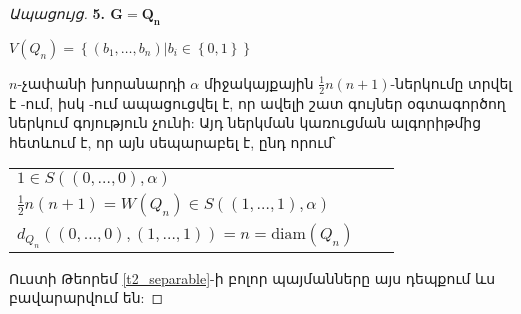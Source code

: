 \begin{proof}[Ապացույց]
\textbf{5. $\mathbf{G=Q_n}$}
\begin{center}
$V(Q_n)=\left\{(b_1,\ldots,b_n) | b_i \in \left\{0,1\right\}\right\}$
\end{center}
$n$-չափանի խորանարդի $\alpha$ միջակայքային $\frac{1}{2}n(n+1)$-ներկումը տրվել է \cite{Petrosyan2010}-ում, իսկ \cite{PetrosyanKhachatrianYepremyanTananyan2011,PetrosyanKhachatrianTananyan2013}-ում ապացուցվել է, որ ավելի շատ գույներ օգտագործող ներկում գոյություն չունի: Այդ ներկման կառուցման ալգորիթմից հետևում է, որ այն սեպարաբել է, ընդ որում՝ 
\begin{center}
\begin{tabular}{lll}
$1 \in S((0,\ldots,0),\alpha)$\\
$\frac{1}{2}n(n+1)=W(Q_n) \in S((1,\ldots,1),\alpha)$ \\
$d_{Q_n}((0,\ldots,0),(1,\ldots,1))=n=\mathrm{diam}(Q_n)$\\
\end{tabular}
\end{center}
Ուստի Թեորեմ \ref{t2_separable}-ի բոլոր պայմանները այս դեպքում ևս բավարարվում են:
\end{proof}

